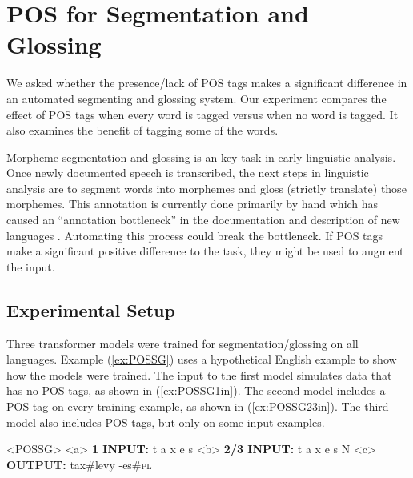 \section{POS for Segmentation and Glossing}
\label{sec:seggls}

We asked whether the presence/lack of POS tags makes a significant difference in an automated segmenting and glossing system. Our experiment compares the effect of POS tags when every word is tagged versus when no word is tagged. It also examines the benefit of tagging some of the words. 

Morpheme segmentation and glossing is an key task in early linguistic analysis. Once newly documented speech is transcribed, the next steps in linguistic analysis are to segment words into morphemes and gloss (strictly translate) those morphemes. This annotation is currently done primarily by hand which has caused an ``annotation bottleneck'' in the documentation and description of new languages \cite{simons_worlds_2013,holton_developing_2017,seifart_language_2018}. Automating this process could break the bottleneck. 
If POS tags make a significant positive difference to the task, they might be used to augment the input. 

\subsection{Experimental Setup}
\label{sec:segglssetup}

Three transformer models were trained for segmentation/glossing on all languages. Example (\ref{ex:POSSG}) uses a hypothetical English example to show how the models were trained. The input to the first model simulates data that has no POS tags, as shown in (\ref{ex:POSSG1in}). The second model includes a POS tag on every training example, as shown in (\ref{ex:POSSG23in}). The third model also includes POS tags, but only on some input examples.

\pex<POSSG>   
\label{ex:POSSG}
\a<a> \textbf{1 INPUT:} \hspace{2 mm} t \hspace{2 mm} a \hspace{2 mm} x \hspace{2 mm} e \hspace{2 mm} s 
\label{ex:POSSG1in}
\a<b> \textbf{2/3 INPUT:} \hspace{2 mm} t \hspace{2 mm} a \hspace{2 mm} x \hspace{2 mm} e \hspace{2 mm} s \hspace{2 mm} N
\label{ex:POSSG23in}
\a<c> \textbf{OUTPUT:} \hspace{2 mm} tax\#levy \hspace{2mm} -es\#\textsc{pl}
\label{ex:POSSGout}
\xe


